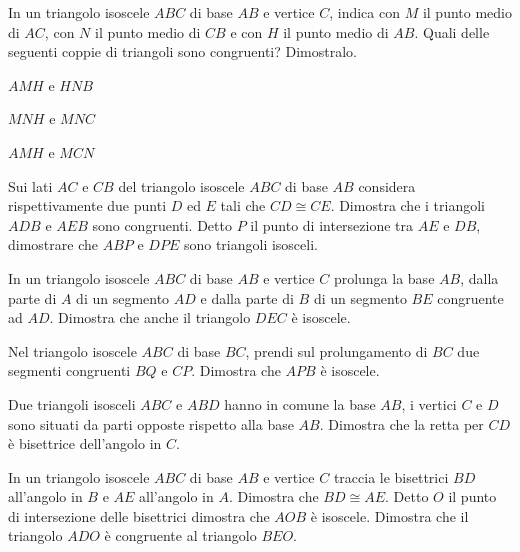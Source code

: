 \begin{multicols}{2}
\begin{esercizio}
\label{ese:2.35}
In un triangolo isoscele $ABC$ di base $AB$ e vertice $C$, indica con $M$ il punto medio di $AC$, con $N$ il punto medio di $CB$ e con $H$ il punto medio di $AB$. Quali delle seguenti coppie di triangoli sono congruenti? Dimostralo.
\begin{multicols}{2}
\begin{enumeratea}
\item $AMH$ e $HNB$
\item $MNH$ e $MNC$
\item $AMH$ e $MCN$
\end{enumeratea}
\end{multicols}
\end{esercizio}

\begin{esercizio}
\label{ese:2.36}
Sui lati $AC$ e $CB$ del triangolo isoscele $ABC$ di base $AB$ considera rispettivamente due punti $D$ ed $E$ tali che $CD\cong CE$. Dimostra che i triangoli $ADB$ e $AEB$ sono congruenti. Detto $P$ il punto di intersezione tra $AE$ e $DB$, dimostrare che $ABP$ e $DPE$ sono triangoli isosceli.
\end{esercizio}

\begin{esercizio}
\label{ese:2.37}
In un triangolo isoscele $ABC$ di base $AB$ e vertice $C$ prolunga la base $AB$, dalla parte di $A$ di un segmento $AD$ e dalla parte di $B$ di un segmento $BE$ congruente ad $AD$. Dimostra che anche il triangolo $DEC$ è isoscele.
\end{esercizio}

\begin{esercizio}
\label{ese:2.38}
Nel triangolo isoscele $ABC$ di base $BC$, prendi sul prolungamento di $BC$ due segmenti congruenti $BQ$ e $CP$. Dimostra che $APB$ è isoscele.
\end{esercizio}

\begin{esercizio}
\label{ese:2.39}
Due triangoli isosceli $ABC$ e $ABD$ hanno in comune la base $AB$, i vertici $C$ e $D$ sono situati da parti opposte rispetto alla base $AB$. Dimostra che la retta per $CD$ è bisettrice dell'angolo in $C$.
\end{esercizio}

\begin{esercizio}
\label{ese:2.40}
In un triangolo isoscele $ABC$ di base $AB$ e vertice $C$ traccia le bisettrici $BD$ all'angolo in $B$ e $AE$ all'angolo in $A$. Dimostra che $BD\cong AE$. Detto $O$ il punto di intersezione delle bisettrici dimostra che $AOB$ è isoscele. Dimostra che il triangolo $ADO$ è congruente al triangolo $BEO$.
\end{esercizio}


\end{multicols}
